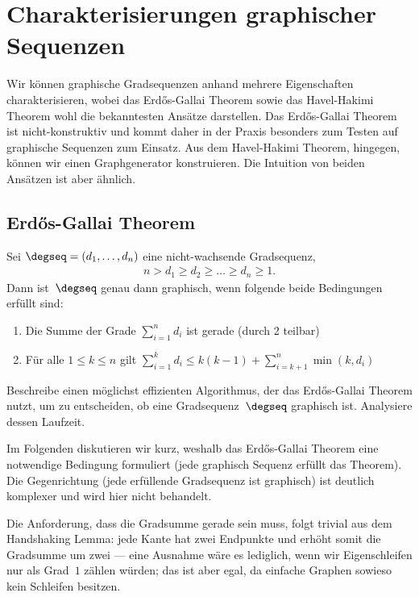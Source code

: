 \section{Charakterisierungen graphischer Sequenzen}
Wir können graphische Gradsequenzen anhand mehrere Eigenschaften charakterisieren, wobei das Erd\H{o}s-Gallai Theorem sowie das Havel-Hakimi Theorem wohl die bekanntesten Ansätze darstellen.
Das Erd\H{o}s-Gallai Theorem ist nicht-konstruktiv und kommt daher in der Praxis besonders zum Testen auf graphische Sequenzen zum Einsatz.
Aus dem Havel-Hakimi Theorem, hingegen, können wir einen Graphgenerator konstruieren.
Die Intuition von beiden Ansätzen ist aber ähnlich.

\subsection{Erd\H{o}s-Gallai Theorem}
\begin{theorem}
    Sei $\degseq = (d_1, \ldots, d_n)$ eine nicht-wachsende Gradsequenz, \dh
    \begin{align}
        n > d_1 \ge d_2 \ge \ldots \ge d_n \ge 1.
    \end{align}
    Dann ist~$\degseq$ genau dann graphisch, wenn folgende beide Bedingungen erfüllt sind:
    \begin{enumerate}
        \item Die Summe der Grade $\sum_{i=1}^n d_i$ ist gerade (durch 2 teilbar)
        \item Für alle $1 \le k \le n$ gilt $\sum_{i=1}^k d_i \le k(k-1) + \sum_{i=k+1}^n \min(k, d_i)$\hfill\qedhere
    \end{enumerate}
\end{theorem}

\begin{exercise}
    Beschreibe einen möglichst effizienten Algorithmus, der das Erd\H{o}s-Gallai Theorem nutzt, um zu entscheiden, ob eine Gradsequenz~$\degseq$ graphisch ist.
    Analysiere dessen Laufzeit.
\end{exercise}

Im Folgenden diskutieren wir kurz, weshalb das Erd\H{o}s-Gallai Theorem eine notwendige Bedingung formuliert (\dh jede graphisch Sequenz erfüllt das Theorem).
Die Gegenrichtung (\dh jede erfüllende Gradsequenz ist graphisch) ist deutlich komplexer und wird hier nicht behandelt.

Die Anforderung, dass die Gradsumme gerade sein muss, folgt trivial aus dem Handshaking Lemma:
jede Kante hat zwei Endpunkte und erhöht somit die Gradsumme um zwei
--- eine Ausnahme wäre es lediglich, wenn wir Eigenschleifen nur als Grad~$1$ zählen würden; das ist aber egal, da einfache Graphen sowieso kein Schleifen besitzen.

